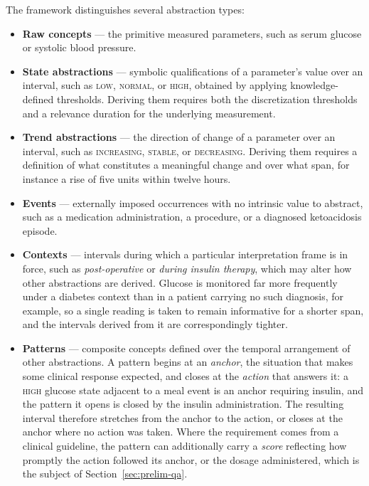 The framework distinguishes several abstraction types:

\begin{itemize}
\item \textbf{Raw concepts} --- the primitive measured parameters, such as serum glucose or systolic blood pressure.
\item \textbf{State abstractions} --- symbolic qualifications of a parameter's value over an interval, such as \textsc{low}, \textsc{normal}, or \textsc{high}, obtained by applying knowledge-defined thresholds. Deriving them requires both the discretization thresholds and a relevance duration for the underlying measurement.
\item \textbf{Trend abstractions} --- the direction of change of a parameter over an interval, such as \textsc{increasing}, \textsc{stable}, or \textsc{decreasing}. Deriving them requires a definition of what constitutes a meaningful change and over what span, for instance a rise of five units within twelve hours.
\item \textbf{Events} --- externally imposed occurrences with no intrinsic value to abstract, such as a medication administration, a procedure, or a diagnosed ketoacidosis episode.
\item \textbf{Contexts} --- intervals during which a particular interpretation frame is in force, such as \emph{post-operative} or \emph{during insulin therapy}, which may alter how other abstractions are derived. Glucose is monitored far more frequently under a diabetes context than in a patient carrying no such diagnosis, for example, so a single reading is taken to remain informative for a shorter span, and the intervals derived from it are correspondingly tighter.
\item \textbf{Patterns} --- composite concepts defined over the temporal arrangement of other abstractions. A pattern begins at an \emph{anchor}, the situation that makes some clinical response expected, and closes at the \emph{action} that answers it: a \textsc{high} glucose state adjacent to a meal event is an anchor requiring insulin, and the pattern it opens is closed by the insulin administration. The resulting interval therefore stretches from the anchor to the action, or closes at the anchor where no action was taken. Where the requirement comes from a clinical guideline, the pattern can additionally carry a \emph{score} reflecting how promptly the action followed its anchor, or the dosage administered, which is the subject of Section~\ref{sec:prelim-qa}.
\end{itemize}

